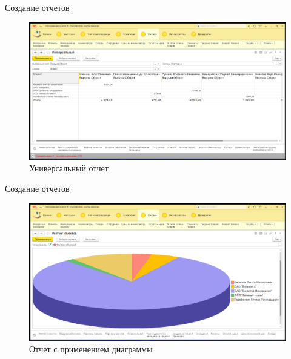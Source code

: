 \documentclass[12pt,a4paper,mathserif]{beamer}
\begin{document}
\begin{frame}{Создание отчетов}
    \begin{figure}
        \centering
        \includegraphics[scale=0.25]{universal.png}
        \caption{Универсальный отчет}
        \label{fig:universal}
    \end{figure}
\end{frame}

\begin{frame}{Создание отчетов}
    \begin{figure}
        \centering
        \includegraphics[scale=0.25]{client.png}
        \caption{Отчет с применением диаграммы}
        \label{fig:client}
    \end{figure}
\end{frame}
\end{document}
